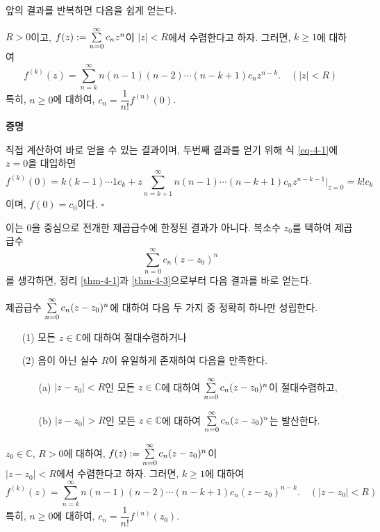 앞의 결과를 반복하면 다음을 쉽게 얻는다.

\begin{salt_corollary}\label{coro-4-1}
$R>0$이고, $f(z):= \sum\limits_{n=0}^\infty c_n z^n$이 $|z|<R$에서 수렴한다고 하자.
그러면, $k\ge1$에 대하여
\begin{equation}\label{eq-4-1}
f^{(k)}(z) = \sum_{n=k}^\infty n(n-1)(n-2)\cdots (n-k+1)c_nz^{n-k}.
\quad (|z|<R)
\end{equation}
특히, $n\ge0$에 대하여, $c_n = \dfrac1{n!} f^{(n)}(0)$.
\end{salt_corollary}

{\bf 증명}

직접 계산하여 바로 얻을 수 있는 결과이며, 두번째 결과를 얻기 위해
식 \eqref{eq-4-1}에 $z=0$을 대입하면
\[
f^{(k)}(0) = k(k-1)\cdots 1c_k + z \sum_{n=k+1}^\infty n(n-1) \cdots (n-k+1)c_n z^{n-k-1}\Big|_{z=0}
= k!c_k
\]
이며, $f(0)=c_0$이다.
\hfill $\square$

이는 $0$을 중심으로 전개한 제곱급수에 한정된 결과가 아니다.
복소수 $z_0$를 택하여 제곱급수
\[
\sum_{n=0}^\infty c_n(z-z_0)^n
\]
를 생각하면, 정리 \ref{thm-4-1}과 \ref{thm-4-3}으로부터
다음 결과를 바로 얻는다.


\begin{salt_corollary} \label{thm-4-2}
제곱급수 $\sum\limits_{n=0}^\infty c_n(z-z_0)^n$에 대하여
다음 두 가지 중 정확히 하나만 성립한다.
\begin{itemize}
\item[(1)] 모든 $z\in\mathbb C$에 대하여 절대수렴하거나
\item[(2)] 음이 아닌 실수 $R$이 유일하게 존재하여 다음을 만족한다.
\begin{itemize}
\item[(a)] $|z-z_0|<R$인 모든 $z\in\mathbb C$에 대하여 
$\sum\limits_{n=0}^\infty c_n(z-z_0)^n$이 절대수렴하고,
\item[(b)] $|z-z_0|>R$인 모든 $z\in\mathbb C$에 대하여 
$\sum\limits_{n=0}^\infty c_n(z-z_0)^n$는 발산한다.
\end{itemize}
\end{itemize}
\end{salt_corollary}

\begin{salt_corollary}\label{coro-4-3}
$z_0\in \mathbb C$, $R>0$에 대하여, 
$f(z):= \sum\limits_{n=0}^\infty c_n (z-z_0)^n$이 \\[1ex]
$|z-z_0|<R$에서 수렴한다고 하자. %
그러면, $k\ge1$에 대하여
\[
f^{(k)}(z) = \sum_{n=k}^\infty n(n-1)(n-2)\cdots (n-k+1)c_n(z-z_0)^{n-k}.
\quad (|z-z_0|<R)
\]
특히, $n\ge0$에 대하여, $c_n = \dfrac1{n!} f^{(n)}(z_0)$.
\end{salt_corollary}

